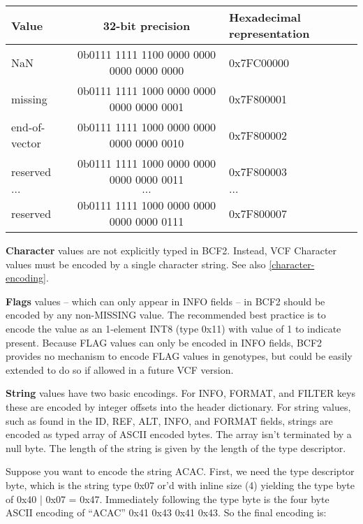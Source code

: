 \documentclass[8pt]{article}
\begin{document}
\vspace{0.1cm}
\begin{tabular}{| l | c | l |} \hline
\textbf{Value}   & \textbf{32-bit precision} & \textbf{Hexadecimal representation} \\ \hline
NaN	    & 0b0111 1111 1100 0000 0000 0000 0000 0000 & 0x7FC00000 \\ \hline
missing & 0b0111 1111 1000 0000 0000 0000 0000 0001 & 0x7F800001 \\ \hline
end-of-vector & 0b0111 1111 1000 0000 0000 0000 0000 0010 & 0x7F800002 \\ \hline
reserved & 0b0111 1111 1000 0000 0000 0000 0000 0011 & 0x7F800003 \\ \hline
$\ldots$ & $\ldots$ & $\ldots$ \\ \hline
reserved & 0b0111 1111 1000 0000 0000 0000 0000 0111 & 0x7F800007 \\ \hline
\end{tabular}

\vspace{0.3cm}
\textbf{Character} values are not explicitly typed in BCF2.  Instead, VCF Character values must be encoded by a single character string. See also \ref{character-encoding}.

\vspace{0.3cm}
\textbf{Flags} values -- which can only appear in INFO fields -- in BCF2 should be encoded by any non-MISSING value.  The recommended best practice is to encode the value as an 1-element INT8 (type 0x11) with value of 1 to indicate present.  Because FLAG values can only be encoded in INFO fields, BCF2 provides no mechanism to encode FLAG values in genotypes, but could be easily extended to do so if allowed in a future VCF version.

\vspace{0.3cm}
\textbf{String} values have two basic encodings.  For INFO, FORMAT, and FILTER keys these are encoded by integer offsets into the header dictionary.  For string values, such as found in the ID, REF, ALT, INFO, and FORMAT fields, strings are encoded as typed array of ASCII encoded bytes.  The array isn't terminated by a null byte.  The length of the string is given by the length of the type descriptor.

Suppose you want to encode the string ACAC.  First, we need the type descriptor byte, which is the string type 0x07 or'd with inline size (4) yielding the type byte of 0x40 | 0x07 = 0x47.  Immediately following the type byte is the four byte ASCII encoding of ``ACAC'' 0x41 0x43 0x41 0x43.  So the final encoding is:
\end{document}
